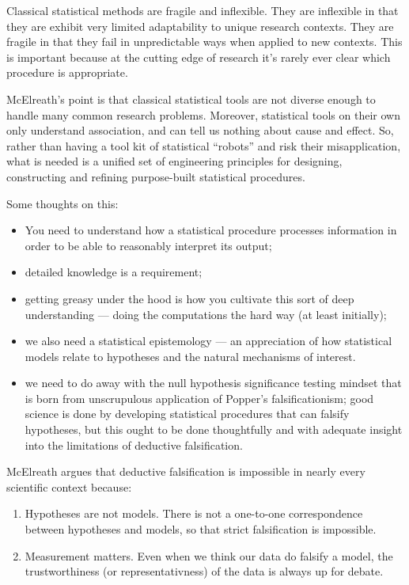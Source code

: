 \documentclass[
]{book}
\providecommand{\tightlist}{%
  \setlength{\itemsep}{0pt}\setlength{\parskip}{0pt}}
\begin{document}
Classical statistical methods are fragile and inflexible. They are inflexible in that they are exhibit very limited adaptability to unique research contexts. They are fragile in that they fail in unpredictable ways when applied to new contexts. This is important because at the cutting edge of research it's rarely ever clear which procedure is appropriate.

McElreath's point is that classical statistical tools are not diverse enough to handle many common research problems. Moreover, statistical tools on their own only understand association, and can tell us nothing about cause and effect. So, rather than having a tool kit of statistical ``robots'' and risk their misapplication, what is needed is a unified set of engineering principles for designing, constructing and refining purpose-built statistical procedures.

Some thoughts on this:

\begin{itemize}
\tightlist
\item
  You need to understand how a statistical procedure processes information in order to be able to reasonably interpret its output;
\item
  detailed knowledge is a requirement;
\item
  getting greasy under the hood is how you cultivate this sort of deep understanding --- doing the computations the hard way (at least initially);
\item
  we also need a statistical epistemology --- an appreciation of how statistical models relate to hypotheses and the natural mechanisms of interest.
\item
  we need to do away with the null hypothesis significance testing mindset that is born from unscrupulous application of Popper's falsificationism; good science is done by developing statistical procedures that can falsify hypotheses, but this ought to be done thoughtfully and with adequate insight into the limitations of deductive falsification.
\end{itemize}

McElreath argues that deductive falsification is impossible in nearly every scientific context because:

\begin{enumerate}
\def\labelenumi{\arabic{enumi}.}
\tightlist
\item
  Hypotheses are not models. There is not a one-to-one correspondence between hypotheses and models, so that strict falsification is impossible.
\item
  Measurement matters. Even when we think our data do falsify a model, the trustworthiness (or representativness) of the data is always up for debate.
\end{enumerate}
\end{document}
